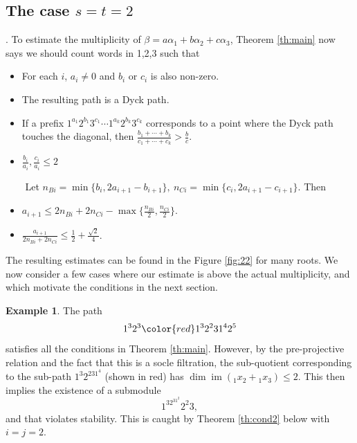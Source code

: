 \documentclass{amsart}
\numberwithin{equation}{section}
\numberwithin{figure}{section}
\numberwithin{table}{section}
\theoremstyle{definition}
\newtheorem{Example}[equation]{Example}
\newcommand{\im}{\operatorname{im}}
\begin{document}
\subsection{The case $s=t=2$} .
To estimate the multiplicity of
$\beta= a \alpha_1+ b\alpha_2+c \alpha_3$, Theorem \ref{th:main} now says we should count words in 1,2,3 such that 
\begin{itemize}

\item  For each $i$, $a_i \neq 0$ and $b_i$ or $c_i$ is also non-zero.

\item The resulting path is a Dyck path.

\item  If a prefix $1^{a_1} 2^{b_1}3^{c_1} \cdots 1^{a_k} 2^{b_k}3^{c_k}$ corresponds to a point where the Dyck path touches the diagonal, then $\displaystyle  \frac{b_1+\cdots +b_k}{c_1+\cdots+c_k} >  \frac{b}{c}.$

\item $\displaystyle \frac{b_i}{a_i}, \frac{c_i}{a_i} \leq 2$

\noindent $\mbox{}$ \hspace{-0.3in} Let $n_{Bi}=  \min \{ b_i, 2a_{i+1}-b_{i+1}\}, \ n_{Ci}=  \min \{ c_i,  2a_{i+1}-c_{i+1}\}.$ Then 

\item  $\displaystyle a_{i+1} \leq 2 n_{Bi}+2 n_{Ci}- \max \{\frac{n_{Bi}}{2} , \frac{n_{Ci}}{2} \}.$

\item $\displaystyle \frac{a_{i+1}}{2n_{Bi}+2n_{Ci}} \leq \frac{1}{2}+\frac{\sqrt{2}}{4}$.


\end{itemize}

\noindent The resulting estimates can be found in the Figure \ref{fig:22} for many roots. We now consider a few cases where our estimate is above the actual multiplicity, and which motivate the conditions in the next section.


\begin{Example} 
The path 
	\begin{equation}
		\label{eq:eea}
		1^3 2^3  {\color{red}1^32^2 3 1^4} 2^5
	\end{equation}
	satisfies all the conditions in Theorem \ref{th:main}. However, by the pre-projective relation and the fact that this is a socle filtration, the sub-quotient corresponding to the sub-path $1^3 2^231^4$ (shown in red) has $\dim \im ({}_1x_2 +{}_1x_3) \leq 2$. This then implies the existence of a submodule 
	$$1^32^31^2 2^2 3,$$ 
	and that violates stability. This is caught by Theorem \ref{th:cond2} below with $i=j=2$.
\end{Example}
\end{document}
